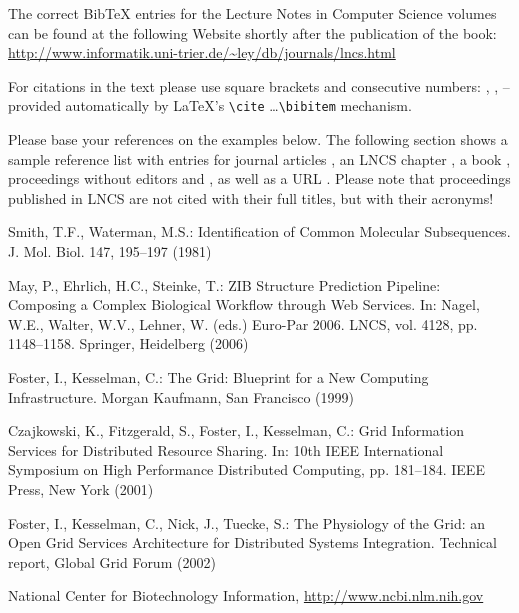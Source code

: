 \documentclass[runningheads]{llncs}
\begin{document}
The correct BibTeX entries for the Lecture Notes in Computer Science
volumes can be found at the following Website shortly after the
publication of the book:
\url{http://www.informatik.uni-trier.de/~ley/db/journals/lncs.html}

For citations in the text please use
square brackets and consecutive numbers: \cite{jour}, \cite{lncschap},
\cite{proceeding1} -- provided automatically
by \LaTeX 's \verb|\cite| \dots\verb|\bibitem| mechanism.

Please base your references on the
examples below. 
The following section shows a sample reference list with entries for
journal articles \cite{jour}, an LNCS chapter \cite{lncschap}, a book
\cite{book}, proceedings without editors \cite{proceeding1} and
\cite{proceeding2}, as well as a URL \cite{url}.
Please note that proceedings published in LNCS are not cited with their
full titles, but with their acronyms!

\begin{thebibliography}{4}

 Smith, T.F., Waterman, M.S.: Identification of Common Molecular
Subsequences. J. Mol. Biol. 147, 195--197 (1981)

 May, P., Ehrlich, H.C., Steinke, T.: ZIB Structure Prediction Pipeline:
Composing a Complex Biological Workflow through Web Services. In: Nagel,
W.E., Walter, W.V., Lehner, W. (eds.) Euro-Par 2006. LNCS, vol. 4128,
pp. 1148--1158. Springer, Heidelberg (2006)

 Foster, I., Kesselman, C.: The Grid: Blueprint for a New Computing
Infrastructure. Morgan Kaufmann, San Francisco (1999)

 Czajkowski, K., Fitzgerald, S., Foster, I., Kesselman, C.: Grid
Information Services for Distributed Resource Sharing. In: 10th IEEE
International Symposium on High Performance Distributed Computing, pp.
181--184. IEEE Press, New York (2001)

 Foster, I., Kesselman, C., Nick, J., Tuecke, S.: The Physiology of the
Grid: an Open Grid Services Architecture for Distributed Systems
Integration. Technical report, Global Grid Forum (2002)

 National Center for Biotechnology Information, \url{http://www.ncbi.nlm.nih.gov}

\end{thebibliography}
\end{document}
